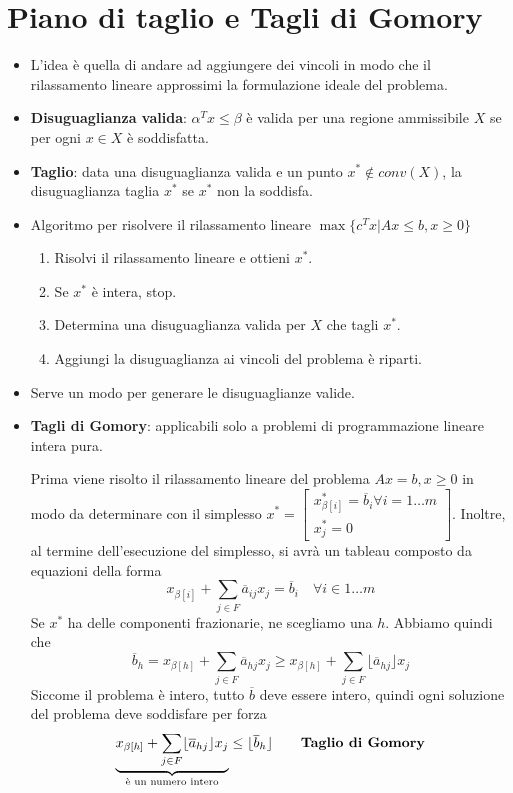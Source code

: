 \section{Piano di taglio e Tagli di Gomory}

\begin{itemize}
	\item L'idea è quella di andare ad aggiungere dei vincoli in modo che il rilassamento lineare approssimi la formulazione ideale del problema.
	\item \textbf{Disuguaglianza valida}: $\alpha^T x \leq \beta$ è valida per una regione ammissibile $X$ se per ogni $x \in X$ è soddisfatta.
	\item \textbf{Taglio}: data una disuguaglianza valida e un punto $x^* \not\in conv(X)$, la disuguaglianza taglia $x^*$ se $x^*$ non la soddisfa.
	\item Algoritmo per risolvere il rilassamento lineare $\max \{ c^T x | Ax \leq b, x \geq 0 \}$
	\begin{enumerate}
		\item Risolvi il rilassamento lineare e ottieni $x^*$.
		\item Se $x^*$ è intera, stop.
		\item Determina una disuguaglianza valida per $X$ che tagli $x^*$.
		\item Aggiungi la disuguaglianza ai vincoli del problema è riparti.
	\end{enumerate}
	\item Serve un modo per generare le disuguaglianze valide.
	\item \textbf{Tagli di Gomory}: applicabili solo a problemi di programmazione lineare intera pura.
	
	Prima viene risolto il rilassamento lineare del problema $Ax = b, x\geq 0$ in modo da determinare con il simplesso $x^* = \begin{bmatrix}
	x_{\beta[i]}^* = \overline{b}_i \forall i = 1\ldots m \\
	x_{j}^* = 0
	\end{bmatrix}$.
	Inoltre, al termine dell'esecuzione del simplesso, si avrà un tableau composto da equazioni della forma
	$$
	x_{\beta[i]} + \sum_{j \in F} \overline{a}_{ij}x_j = \overline{b}_i \quad \forall i \in 1 \ldots m
	$$
	Se $x^*$ ha delle componenti frazionarie, ne scegliamo una $h$.
	Abbiamo quindi che
	$$
	\overline{b}_h = x_{\beta[h]} + \sum_{j \in F} \overline{a}_{hj}x_j \geq  x_{\beta[h]} + \sum_{j \in F} \lfloor\overline{a}_{hj}\rfloor x_j
	$$
	Siccome il problema è intero, tutto $\overline{b}$ deve essere intero, quindi ogni soluzione del problema deve soddisfare per forza
	$$
	 \underbrace{x_{\beta[h]} + \sum_{j \in F} \lfloor \overline{a}_{hj} \rfloor x_j}_{\text{è un numero intero}} \leq  \lfloor \overline{b}_h\rfloor \qquad\text{\textbf{Taglio di Gomory}}
	$$
	

\end{itemize}
